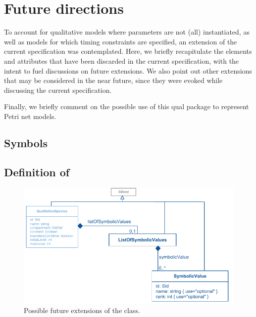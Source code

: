 
\section{Future directions}
\label{apdx-future}

To account for qualitative models where parameters are not (all) instantiated, as well as models for which timing constraints are specified, an extension of the current specification was contemplated. Here, we briefly recapitulate the elements and attributes that have been discarded in the current specification, with the intent to fuel discussions on future extensions. We also point out other extensions that may be considered in the near future, since they were evoked while discussing the current specification.

Finally, we briefly comment on the possible use of this qual package to represent Petri net  models. 



\subsection{Symbols}

\subsection*{Definition of } %

\begin{figure}[hb]
  \includegraphics{figs/qual-qualitative-species-future-uml.pdf}
  \caption{Possible future extensions of the \QualitativeSpecies class.}
  \label{qual_future_directions}
\end{figure}

